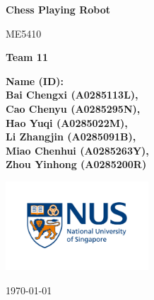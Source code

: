 \documentclass[10pt, a4paper, twocolumn]{article}
\newcommand\course{Materials, Sensors, Actuators & Fabrication in Robotics}
\newcommand\hwnumber{ME5410}
\newcommand\teamnumber{Team 11}
\newcommand\Information{Name (ID): \\Bai Chengxi (A0285113L), \\Cao Chenyu (A0285295N), \\Hao Yuqi (A0285022M), \\Li Zhangjin (A0285091B), \\Miao Chenhui (A0285263Y), \\Zhou Yinhong (A0285200R)}                        %
\begin{document}
\begin{titlepage}
    \begin{center}
        \vspace*{3cm}
            
        \Huge
        \textbf{Chess Playing Robot}
            
        \vspace{1cm}
        \huge
        \hwnumber
            
        \vspace{1.5cm}
        \Large

        \textbf{\teamnumber}
        
        \vspace{1.5cm}
        \Large
        
        \textbf{\Information}                      %
        
            
        \vfill
        
            
        \vspace{1cm}
            
        \includegraphics[width=0.4\textwidth]{logo-nus.png}
        \\
        
        \Large
        
        \today
            
    \end{center}
\end{titlepage}
\end{document}
